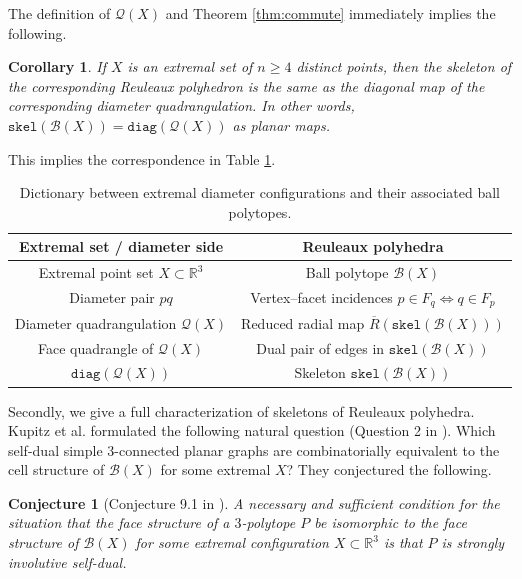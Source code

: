 \documentclass[10pt,a4paper]{article}
\renewcommand{\arraystretch}{1.5}
\newtheorem{corollary}[theorem]{Corollary}
\newtheorem{conjecture}[theorem]{Conjecture}
\newcommand{\Bc}[0]{\mathcal{B}}
\newcommand{\skel}[0]{\mathtt{skel}}
\newcommand{\diag}[0]{\mathtt{diag}}
\newcommand{\qt}{\mathcal{Q}}
\begin{document}
The definition of $\qt(X)$ and Theorem \ref{thm:commute} immediately implies the following.

\begin{corollary}\label{cor:skeldiagonbody}
    If $X$ is an extremal set of $n\ge 4$ distinct points, then the  skeleton of the corresponding Reuleaux polyhedron is the same as the diagonal map of the corresponding diameter quadrangulation. In other words, $\skel(\Bc(X))=\diag(\qt(X))$ as planar maps.
\end{corollary}

This implies the correspondence in Table \ref{tab:extremal-ball polytope-dictionary}.


\begin{table}[ht]
\centering

\renewcommand{\arraystretch}{1.25}
\begin{tabular}{c|c}
\textbf{Extremal set / diameter side}
&
\textbf{Reuleaux polyhedra }
\\
\hline

Extremal point set $X\subset \mathbb R^3$
&
Ball polytope $\Bc(X)$
\\


Diameter pair $pq$
&
Vertex--facet incidences $p\in F_q \Leftrightarrow  q\in F_p$
\\


Diameter quadrangulation $\qt(X)$
&
Reduced radial map $\overline R(\skel(\Bc(X)))$
\\

Face quadrangle of $\qt(X)$
&
Dual pair of edges in $\skel(\Bc(X))$
\\
$\diag(\qt(X))$
&
Skeleton $\skel(\Bc(X))$
\\


\end{tabular}
\caption{Dictionary between extremal diameter configurations and their associated ball polytopes.}
\label{tab:extremal-ball polytope-dictionary}
\end{table}


Secondly, we give a full characterization of skeletons of Reuleaux polyhedra. Kupitz et al. formulated the following natural question (Question 2 in \cite{kupitz2010ball}). Which self-dual simple 3-connected planar graphs are combinatorially equivalent to the cell structure of $\Bc(X)$ for some extremal $X$? They conjectured the following.

\begin{conjecture}[Conjecture 9.1 in \cite{kupitz2010ball}]\label{conj:kupitz}
A necessary and sufficient condition for the situation that the face structure of a $3$-polytope $P$ be isomorphic to the face structure of $\Bc(X)$ for some extremal configuration $X \subset \mathbb{R}^3$ is that $P$ is strongly involutive self-dual.
\end{conjecture}
\end{document}
